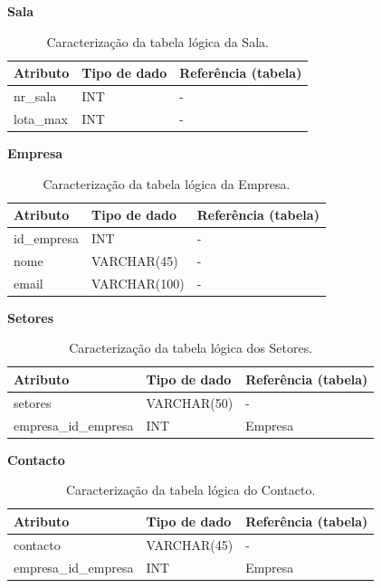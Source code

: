 \documentclass[12pt,a4paper]{article}
\renewcommand{\arraystretch}{1.5}  %
\begin{document}
\begin{table}[H]
\textbf{Sala}

\centering
\renewcommand{\arraystretch}{1.2}
\begin{tabularx}{\textwidth}{|X|l|X|}
\hline
\textbf{Atributo} & \textbf{Tipo de dado} & \textbf{Referência (tabela)} \\ \hline

nr\_sala & INT & - \\ \hline
lota\_max & INT & - \\ \hline

\end{tabularx}
\caption{Caracterização da tabela lógica da Sala.}
\end{table}

\begin{table}[H]
\textbf{Empresa}

\centering
\renewcommand{\arraystretch}{1.2}
\begin{tabularx}{\textwidth}{|X|l|X|}
\hline
\textbf{Atributo} & \textbf{Tipo de dado} & \textbf{Referência (tabela)} \\ \hline

id\_empresa & INT & - \\ \hline
nome & VARCHAR(45) & - \\ \hline
email & VARCHAR(100) & - \\ \hline

\end{tabularx}
\caption{Caracterização da tabela lógica da Empresa.}
\end{table}


\begin{table}[H]
\textbf{Setores}

\centering
\renewcommand{\arraystretch}{1.2}
\begin{tabularx}{\textwidth}{|X|l|X|}
\hline
\textbf{Atributo} & \textbf{Tipo de dado} & \textbf{Referência (tabela)} \\ \hline

setores & VARCHAR(50) & - \\ \hline
empresa\_id\_empresa & INT & Empresa \\ \hline

\end{tabularx}
\caption{Caracterização da tabela lógica dos Setores.}
\end{table}


\begin{table}[H]
\textbf{Contacto}

\centering
\renewcommand{\arraystretch}{1.2}
\begin{tabularx}{\textwidth}{|X|l|X|}
\hline
\textbf{Atributo} & \textbf{Tipo de dado} & \textbf{Referência (tabela)} \\ \hline

contacto & VARCHAR(45) & - \\ \hline
empresa\_id\_empresa & INT & Empresa \\ \hline

\end{tabularx}
\caption{Caracterização da tabela lógica do Contacto.}
\end{table}
\end{document}
